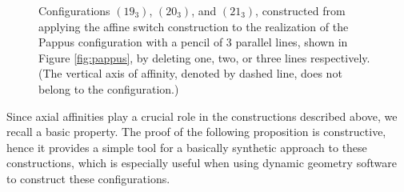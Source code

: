 \documentclass[reqno,12pt]{amsart}
\theoremstyle{plain}
\theoremstyle{definition}
\theoremstyle{remark}
\begin{document}
\begin{figure}[htbp]
\begin{center} \hskip -10pt 
 \hskip 6pt
 \hskip 6pt
\caption{Configurations $(19_{3})$, $(20_{3})$, and $(21_{3})$, constructed from applying the affine switch construction to the realization 
of the Pappus configuration with a pencil of 3 parallel lines, shown in Figure \ref{fig:pappus}, by deleting one, two, or three lines respectively.
(The vertical axis of affinity, denoted by dashed line, does not belong to the configuration.)}
\label{fig:(k-1)m+}
\end{center}
\end{figure}

Since axial affinities play a crucial role in the constructions described above, we recall a basic property. 
The proof of the following proposition is constructive, hence it provides a simple tool for a basically synthetic 
approach to these constructions, which is especially useful when using dynamic geometry software to construct these configurations.
\end{document}
